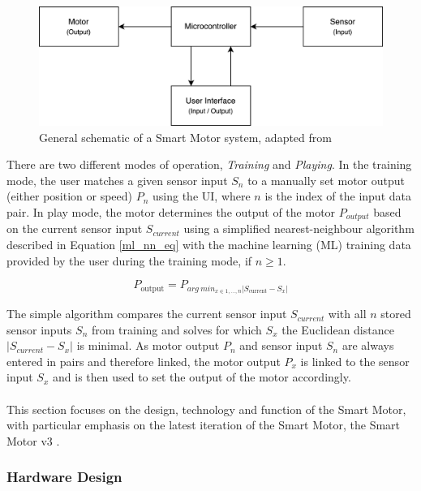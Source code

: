 \begin{figure}[H]
    \centering
    \includegraphics[width=0.75\linewidth]{overleaf/images/sm_concept.png}
    \vspace{\ftspace}
    \caption{General schematic of a Smart Motor system, adapted from \citet[p. 19]{dahal_designing_2024}}
    \label{fig:sm_schematic}
\end{figure}

There are two different modes of operation, \textit{Training} and \textit{Playing}. In the training mode, the user matches a given sensor input $S_n$ to a manually set motor output (either position or speed) $P_n$ using the UI, where $n$ is the index of the input data pair.
In play mode, the motor determines the output of the motor $P_{output}$ based on the current sensor input $S_{current}$ using a simplified nearest-neighbour algorithm described in Equation \ref{ml_nn_eq} with the machine learning (ML) training data provided by the user during the training mode, if $n \geq 1$.

\begin{equation}\label{ml_nn_eq}
    P_{\text{output}} = P_{arg\ min_{x \in {1,\ldots,n}} |S_{\text{current}} - S_x|}
\end{equation}

The simple algorithm compares the current sensor input $S_{current}$ with all $n$ stored sensor inputs $S_n$ from training and solves for which $S_x$ the Euclidean distance $|S_{current}-S_x|$ is minimal. As motor output $P_n$ and sensor input $S_n$ are always entered in pairs and therefore linked, the motor output $P_x$ is linked to the sensor input $S_x$ and is then used to set the output of the motor accordingly.
\\\\
This section focuses on the design, technology and function of the Smart Motor, with particular emphasis on the latest iteration of the Smart Motor, the Smart Motor v3 \citep[p. 38]{dahal_designing_2024}.

\subsubsection{\label{sec:methods_sm_mech}Hardware Design}

